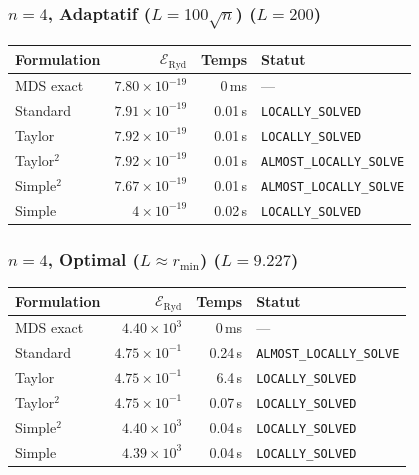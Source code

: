 \subsubsection{$n=4$, Adaptatif ($L{=}100\sqrt{n}$) ($L=200$)}
\begin{longtable}{@{}lrrl@{}}
  \toprule
  Formulation & $\mathcal{E}_{\mathrm{Ryd}}$ & Temps & Statut \\
  \midrule
  \endhead
  MDS exact & $7.80\times10^{-19}$ & 0\,ms & --- \\
  Standard & $7.91\times10^{-19}$ & 0.01\,s & \texttt{LOCALLY\_SOLVED} \\
  Taylor & $7.92\times10^{-19}$ & 0.01\,s & \texttt{LOCALLY\_SOLVED} \\
  Taylor$^2$ & $7.92\times10^{-19}$ & 0.01\,s & \texttt{ALMOST\_LOCALLY\_SOLVE} \\
  Simple$^2$ & $7.67\times10^{-19}$ & 0.01\,s & \texttt{ALMOST\_LOCALLY\_SOLVE} \\
  Simple & $4\times10^{-19}$ & 0.02\,s & \texttt{LOCALLY\_SOLVED} \\
  \bottomrule
\end{longtable}

\subsubsection{$n=4$, Optimal ($L{\approx}r_{\min}$) ($L=9.227$)}
\begin{longtable}{@{}lrrl@{}}
  \toprule
  Formulation & $\mathcal{E}_{\mathrm{Ryd}}$ & Temps & Statut \\
  \midrule
  \endhead
  MDS exact & $4.40\times10^{3}$ & 0\,ms & --- \\
  Standard & $4.75\times10^{-1}$ & 0.24\,s & \texttt{ALMOST\_LOCALLY\_SOLVE} \\
  Taylor & $4.75\times10^{-1}$ & 6.4\,s & \texttt{LOCALLY\_SOLVED} \\
  Taylor$^2$ & $4.75\times10^{-1}$ & 0.07\,s & \texttt{LOCALLY\_SOLVED} \\
  Simple$^2$ & $4.40\times10^{3}$ & 0.04\,s & \texttt{LOCALLY\_SOLVED} \\
  Simple & $4.39\times10^{3}$ & 0.04\,s & \texttt{LOCALLY\_SOLVED} \\
  \bottomrule
\end{longtable}

